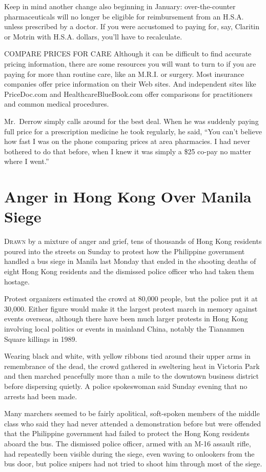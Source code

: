 ﻿\documentclass[12pt]{article}
\begin{document}
Keep in mind another change also beginning in January: over-the-counter pharmaceuticals will no
longer be eligible for reimbursement from an H.S.A. unless prescribed by a doctor. If you were
accustomed to paying for, say, Claritin or Motrin with H.S.A. dollars, you'll have to recalculate.

COMPARE PRICES FOR CARE Although it can be difficult to find accurate pricing information, there are
some resources you will want to turn to if you are paying for more than routine care, like an M.R.I.
or surgery. Most insurance companies offer price information on their Web sites. And independent
sites like PriceDoc.com and HealthcareBlueBook.com offer comparisons for practitioners and common
medical procedures.

Mr.~Derrow simply calls around for the best deal. When he was suddenly paying full price for a
prescription medicine he took regularly, he said, ``You can't believe how fast I was on the phone
comparing prices at area pharmacies. I had never bothered to do that before, when I knew it was
simply a \$25 co-pay no matter where I went.''

\pagebreak
\section{Anger in Hong Kong Over Manila Siege}

\lettrine{D}{rawn} by a mixture of anger and grief, tens of thousands of
Hong Kong residents poured into the streets on Sunday to protest how the Philippine government
handled a bus siege in Manila last Monday that ended in the shooting deaths of eight Hong Kong
residents and the dismissed police officer who had taken them hostage.

Protest organizers estimated the crowd at 80,000 people, but the police put it at 30,000. Either
figure would make it the largest protest march in memory against events overseas, although there
have been much larger protests in Hong Kong involving local politics or events in mainland China,
notably the Tiananmen Square killings in 1989.

Wearing black and white, with yellow ribbons tied around their upper arms in remembrance of the
dead, the crowd gathered in sweltering heat in Victoria Park and then marched peacefully more than a
mile to the downtown business district before dispersing quietly. A police spokeswoman said Sunday
evening that no arrests had been made.

Many marchers seemed to be fairly apolitical, soft-spoken members of the middle class who said they
had never attended a demonstration before but were offended that the Philippine government had
failed to protect the Hong Kong residents aboard the bus. The dismissed police officer, armed with
an M-16 assault rifle, had repeatedly been visible during the siege, even waving to onlookers from
the bus door, but police snipers had not tried to shoot him through most of the siege.
\end{document}
